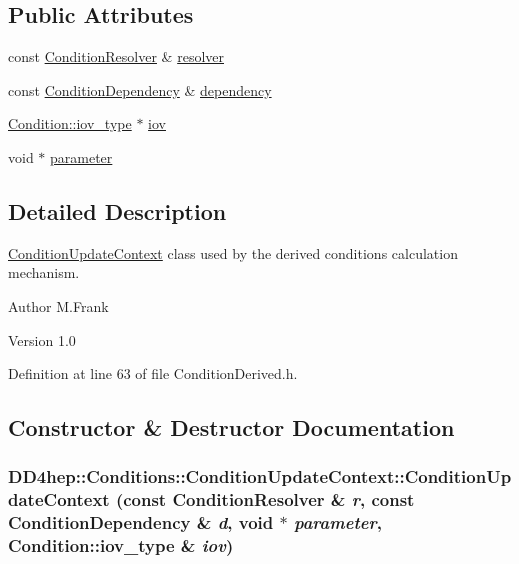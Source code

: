 \subsection*{Public Attributes}
\begin{DoxyCompactItemize}
\item 
const \hyperlink{class_d_d4hep_1_1_conditions_1_1_condition_resolver}{ConditionResolver} \& \hyperlink{class_d_d4hep_1_1_conditions_1_1_condition_update_context_afec7d015ccb53ab2c84eec000846b15d}{resolver}
\item 
const \hyperlink{class_d_d4hep_1_1_conditions_1_1_condition_dependency}{ConditionDependency} \& \hyperlink{class_d_d4hep_1_1_conditions_1_1_condition_update_context_aaea028db7dc9ed95d2a5f34a4a2a3efd}{dependency}
\item 
\hyperlink{class_d_d4hep_1_1_i_o_v}{Condition::iov\_\-type} $\ast$ \hyperlink{class_d_d4hep_1_1_conditions_1_1_condition_update_context_acdeb1015159a6df55df3c3e614651d4e}{iov}
\item 
void $\ast$ \hyperlink{class_d_d4hep_1_1_conditions_1_1_condition_update_context_adad82de460a5c71b568e73e2f76923ba}{parameter}
\end{DoxyCompactItemize}


\subsection{Detailed Description}
\hyperlink{class_d_d4hep_1_1_conditions_1_1_condition_update_context}{ConditionUpdateContext} class used by the derived conditions calculation mechanism. \begin{DoxyAuthor}{Author}
M.Frank 
\end{DoxyAuthor}
\begin{DoxyVersion}{Version}
1.0 
\end{DoxyVersion}


Definition at line 63 of file ConditionDerived.h.

\subsection{Constructor \& Destructor Documentation}
\hypertarget{class_d_d4hep_1_1_conditions_1_1_condition_update_context_a259338f84924fdd338add25e7f951858}{
\subsubsection[{ConditionUpdateContext}]{\setlength{\rightskip}{0pt plus 5cm}DD4hep::Conditions::ConditionUpdateContext::ConditionUpdateContext (const {\bf ConditionResolver} \& {\em r}, \/  const {\bf ConditionDependency} \& {\em d}, \/  void $\ast$ {\em parameter}, \/  {\bf Condition::iov\_\-type} \& {\em iov})}}
\label{class_d_d4hep_1_1_conditions_1_1_condition_update_context_a259338f84924fdd338add25e7f951858}



